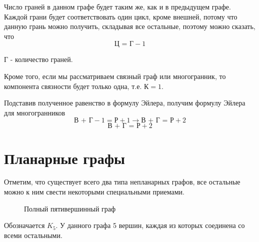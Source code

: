 \documentclass[russian]{lecture-notes}
\begin{document}
Число граней в данном графе будет таким же, как и в предыдущем графе. Каждой грани будет соответствовать один цикл, кроме внешней, потому что данную грань можно получить, складывая все остальные, поэтому можно сказать, что
\begin{equation}
    \text{Ц = Г} - 1
    \label{eq:1}
\end{equation}
\begin{note}
    Г - количество граней.
\end{note} 

Кроме того, если мы рассматриваем связный граф или многогранник, то компонента связности будет только одна, т.е. $\text{К} = 1$.

Подставив полученное равенство в формулу Эйлера, получим формулу Эйлера для многогранников
$$ \text{В + Г} - 1 = \text{Р} + 1 \rightarrow \text{В + Г = Р} + 2$$
\begin{equation}
    \text{В + Г = Р} + 2
    \label{eq:tojdEylera}
\end{equation}

\newpage

\section{Планарные графы}
Отметим, что существует всего два типа непланарных графов, все остальные можно к ним свести некоторыми специальными приемами.

\begin{figure}[H]
    \centering
    \caption{Полный пятивершинный граф}
    \label{fig:3}
\end{figure}

\begin{note}
    Обозначается $K_5$. У данного графа 5 вершин, каждая из которых соединена со всеми остальными.
\end{note}
\end{document}
